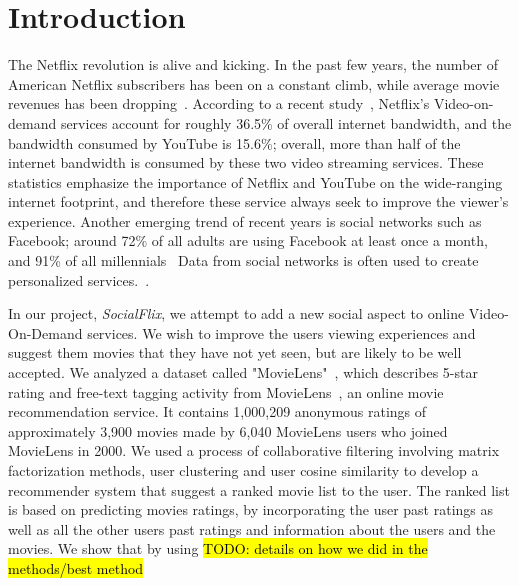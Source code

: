\section{Introduction}
\label{sec:intro}

The Netflix revolution is alive and kicking. 
In the past few years, the number of American Netflix subscribers has been on a constant climb, while average movie revenues has been dropping~\cite{MisixNetflix}.
According to a recent study~\cite{VarietyNetflixBandwidth}, Netflix's Video-on-demand services account for roughly 36.5\% of overall internet bandwidth, and the bandwidth consumed by YouTube is 15.6\%; overall, more than half of the internet bandwidth is consumed by these two video streaming services.
These statistics emphasize the importance of Netflix and YouTube on the wide-ranging internet footprint, and therefore these service always seek to improve the viewer's experience.
Another emerging trend of recent years is social networks such as Facebook; around 72\% of all adults are using Facebook at least once a month, and 91\% of all millennials~\cite{FacebookStats} Data from social networks is often used to create personalized services.~\cite{carmel2009personalized}.


In our project, \textit{SocialFlix}, we attempt to add a new social aspect to online Video-On-Demand services. We wish to improve the users viewing experiences and suggest them movies that they have not yet seen, but are likely to be well accepted. We analyzed a dataset called "MovieLens"~\cite{GroupLens}, which describes 5-star rating and free-text tagging activity from MovieLens~\cite{MovieLens}, an online movie recommendation service. It contains 1,000,209 anonymous ratings of approximately 3,900 movies made by 6,040 MovieLens users who joined MovieLens in 2000. We used a process of collaborative filtering involving matrix factorization methods, user clustering and user cosine similarity to develop a recommender system that suggest a ranked movie list to the user. The ranked list is based on predicting movies ratings, by incorporating the user past ratings as well as all the other users past ratings and information about the users and the movies. We show that by using \hl{TODO: details on how we did in the methods/best method}

